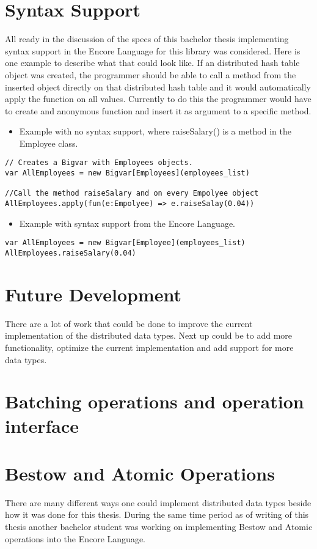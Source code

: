 \section{Syntax Support}
All ready in the discussion of the specs of this bachelor thesis implementing syntax support in the Encore Language for this library was considered. Here is one example to describe what that could look like. If an distributed hash table object was created, the programmer should be able to call a method from the inserted object directly on that distributed hash table and it would automatically apply the function on all values. Currently to do this the programmer would have to create and anonymous function and insert it as argument to a specific method.

\begin{itemize}
\item \blindtext Example with no syntax support, where raiseSalary() is a method in the Employee class.
\end{itemize}

\begin{lstlisting}
// Creates a Bigvar with Employees objects.
var AllEmployees = new Bigvar[Employees](employees_list)

//Call the method raiseSalary and on every Empolyee object 
AllEmployees.apply(fun(e:Empolyee) => e.raiseSalay(0.04))
\end{lstlisting}

\begin{itemize}
\item \blindtext Example with syntax support from the Encore Language. 
\end{itemize}
\begin{lstlisting}
var AllEmployees = new Bigvar[Employee](employees_list) 
AllEmployees.raiseSalary(0.04) 
\end{lstlisting}

\section{Future Development}
There are a lot of work that could be done to improve the current implementation of the distributed data types. Next up could be to add more functionality, optimize the current implementation and add support for more data types.

\section{Batching operations and operation interface}

\section{Bestow and Atomic Operations}
There are many different ways one could implement distributed data types beside how it was done for this thesis. During the same time period as of writing of this thesis another bachelor student was working on implementing Bestow and Atomic operations into the Encore Language. \\ 